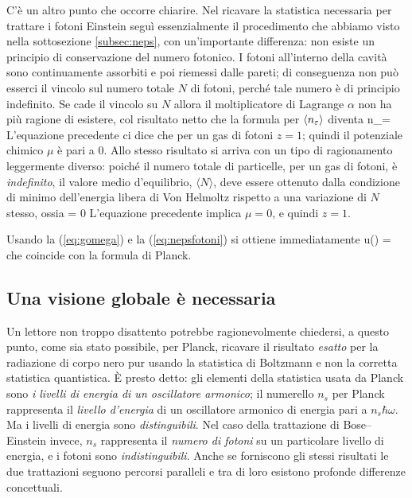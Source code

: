 C'è un altro punto che occorre chiarire. Nel ricavare la statistica necessaria per trattare i fotoni Einstein seguì essenzialmente il procedimento che abbiamo visto nella sottosezione \ref{subsec:neps}, con un'importante differenza: non esiste un principio di conservazione del numero fotonico. I fotoni all'interno della cavità sono continuamente assorbiti e poi riemessi dalle pareti; di conseguenza non può esserci il vincolo sul numero totale $N$ di fotoni, perché tale numero è di principio indefinito. Se cade il vincolo su $N$ allora il moltiplicatore di Lagrange $\alpha$ non ha più ragione di esistere, col risultato netto che la formula per $\langle n_\varepsilon \rangle$ diventa
\be
\label{eq:nepsfotoni}
\langle n_\eps \rangle = 
\ee
L'equazione precedente ci dice che per un gas di fotoni $z=1$; quindi il potenziale chimico $\mu$ è pari a 0. Allo stesso risultato si arriva con un tipo di ragionamento leggermente diverso: poiché il numero totale di particelle, per un gas di fotoni, è {\em indefinito}, il valore medio d'equilibrio, $\langle N \rangle$, deve essere ottenuto dalla condizione di minimo dell'energia libera di Von Helmoltz rispetto a una variazione di $N$ stesso, ossia
\be
{} = 0
\ee
L'equazione precedente implica $\mu = 0$, e quindi $z = 1$.

Usando la (\ref{eq:gomega}) e la (\ref{eq:nepsfotoni}) si ottiene immediatamente
\be
u(\omega)\de{\omega} = 
\de{\omega}
\ee
che coincide con la formula di Planck.

\subsection{Una visione globale è necessaria}
Un lettore non troppo disattento potrebbe ragionevolmente chiedersi, a questo punto, come sia stato possibile, per Planck, ricavare il risultato {\em esatto} per la radiazione di corpo nero pur usando la statistica di Boltzmann e non la corretta statistica quantistica. È presto detto: gli elementi della statistica usata da Planck sono {\em i livelli di energia di un oscillatore armonico}; il numerello $n_s$ per Planck rappresenta il {\em livello d'energia} di un oscillatore armonico di energia pari a $n_s \hbar\omega$. Ma i livelli di energia sono {\em distinguibili}. Nel caso della trattazione di Bose--Einstein invece, $n_s$ rappresenta il {\em numero di fotoni} su un particolare livello di energia, e i fotoni sono {\em indistinguibili}. Anche se forniscono gli stessi risultati le due trattazioni seguono percorsi paralleli e tra di loro esistono profonde differenze concettuali.

